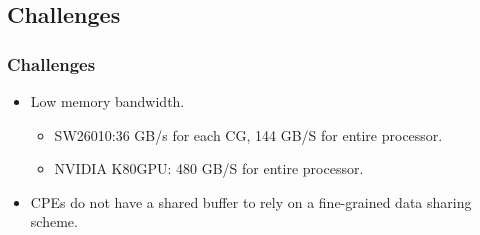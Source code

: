 \subsection{Challenges}
\begin{frame}
    \frametitle{Challenges}
	\begin{itemize}
		\item Low memory bandwidth. 
		\begin{itemize}
			\item SW26010:36 GB/s for each CG, 144 GB/S for entire processor.  
			\item NVIDIA K80GPU: 480 GB/S for entire processor. 
		\end{itemize}
		\item CPEs do not have a shared buffer to rely on a fine-grained data sharing scheme. 
	\end{itemize}
\end{frame}

	

